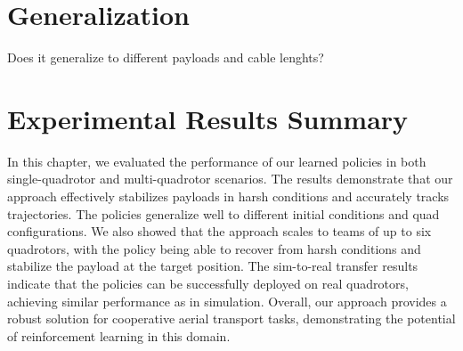 \section{Generalization}
Does it generalize to different payloads and cable lenghts?

\section{Experimental Results Summary}
In this chapter, we evaluated the performance of our learned policies in both single-quadrotor and multi-quadrotor scenarios. The results demonstrate that our approach effectively stabilizes payloads in harsh conditions and accurately tracks trajectories. The policies generalize well to different initial conditions and quad configurations. We also showed that the approach scales to teams of up to six quadrotors, with the policy being able to recover from harsh conditions and stabilize the payload at the target position. The sim-to-real transfer results indicate that the policies can be successfully deployed on real quadrotors, achieving similar performance as in simulation.\todo{} Overall, our approach provides a robust solution for cooperative aerial transport tasks, demonstrating the potential of reinforcement learning in this domain.
